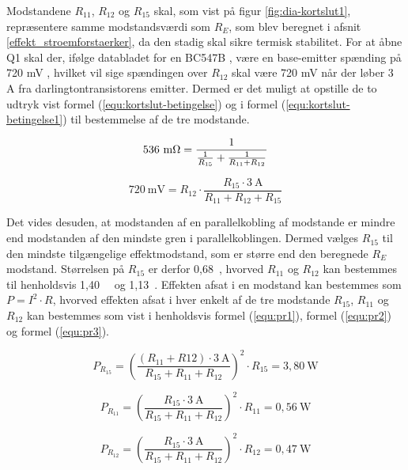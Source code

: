 Modstandene $R_{11}$, $R_{12}$ og $R_{15}$ skal, som vist på figur \ref{fig:dia-kortslut1}, repræsentere samme modstandsværdi som $R_E$, som blev beregnet i afsnit \ref{effekt_stroemforstaerker}, da den stadig skal sikre termisk stabilitet. For at åbne Q1 skal der, ifølge databladet for en BC547B \cite{bc547b-datablad}, være en base-emitter spænding på 720 mV , hvilket vil sige spændingen over $R_{12}$ skal være 720 mV når der løber 3 A fra darlingtontransistorens emitter. Dermed er det muligt at opstille de to udtryk vist formel (\ref{equ:kortslut-betingelse}) og i formel (\ref{equ:kortslut-betingelse1}) til bestemmelse af de tre modstande.

\begin{equation}
\label{equ:kortslut-betingelse}
\mathrm{536~m\ohm} = \frac{1}{\frac{1}{R_{15}}+\frac{1}{R_{11} + R_{12}}}
\end{equation}

\begin{equation}
\label{equ:kortslut-betingelse1}
\mathrm{720~mV} = R_{12} \cdot \frac{R_{15} \cdot \mathrm{3~A}}{R_{11} + R_{12} + R_{15}}
\end{equation}

Det vides desuden, at modstanden af en parallelkobling af modstande er mindre end modstanden af den mindste gren i parallelkoblingen. Dermed vælges $R_{15}$ til den mindste tilgængelige effektmodstand, som er større end den beregnede $R_E$ modstand. Størrelsen på $R_{15}$ er derfor 0,68~\ohm, hvorved $R_{11}$ og $R_{12}$ kan bestemmes til henholdsvis 1,40~\ohm~ og 1,13~\ohm. Effekten afsat i en modstand kan bestemmes som $P = I^2 \cdot R$, hvorved effekten afsat i hver enkelt af de tre modstande $R_{15}$, $R_{11}$ og $R_{12}$ kan bestemmes som vist i henholdsvis formel (\ref{equ:pr1}), formel (\ref{equ:pr2}) og formel (\ref{equ:pr3}).

\begin{equation}
\label{equ:pr1}
P_{R_{15}} = \left(\frac{(R_{11} + R{12}) \cdot \mathrm{3~A}}{R_{15} + R_{11} + R_{12}}\right)^2 \cdot R_{15} = \mathrm{3,80~W}
\end{equation}

\begin{equation}
\label{equ:pr2}
P_{R_{11}} = \left(\frac{R_{15} \cdot \mathrm{3~A}}{R_{15} + R_{11} + R_{12}}\right)^2 \cdot R_{11} = \mathrm{0,56~W}
\end{equation}

\begin{equation}
\label{equ:pr3}
P_{R_{12}} = \left(\frac{R_{15} \cdot \mathrm{3~A}}{R_{15} + R_{11} + R_{12}}\right)^2 \cdot R_{12} = \mathrm{0,47~W}
\end{equation}

